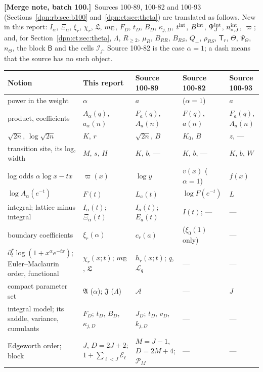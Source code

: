 \documentclass[11pt]{article}
\numberwithin{equation}{section}
\theoremstyle{definition}\newtheorem{definition}[theorem]{Definition}
\theoremstyle{remark}\newtheorem{remark}[theorem]{Remark}
\newcommand{\mergenoted}[1]{\par\smallskip\noindent\textbf{[Merge note, batch 100.]}\ #1\par\smallskip}
\begin{document}
\mergenoted{Sources 100-89, 100-82 and 100-93 (Sections~\ref{dpn:rb:sec:b100}
and~\ref{dpn:ct:sec:theta}) are translated as follows.  New in this report:
$I_\alpha$, $\Xi_\alpha$, $\xi_r$, $\chi_r$, $\mathfrak L$, $m_{\rm E}$, $F_D$,
$t_D$, $B_D$, $\kappa_{j,D}$, $t^{\rm int}$, $B^{\rm int}$, $\Psi^{\rm int}_J$,
$n^{\rm int}_{*,J}$, $\varpi$; and, for Section~\ref{dpn:ct:sec:theta}, $\Lambda$,
$R_{\ge2}$, $\mu_R$, $B_{RR}$, $B_{RS}$, $Q_\perp$, $\rho_{RS}$, $\mathsf T_r$,
$\Theta$, $\Psi_\Theta$, $n_\Theta$, the block $\mathsf B$ and the cells
$\mathcal I_j$.  Source 100-82 is the case $\alpha=1$; a dash means that the
source has no such object.}
\begin{center}
\footnotesize
\setlength{\tabcolsep}{3.5pt}
\begin{tabular}{>{\raggedright\arraybackslash}p{3.3cm}>{\raggedright\arraybackslash}p{3.0cm}>{\raggedright\arraybackslash}p{2.6cm}>{\raggedright\arraybackslash}p{2.6cm}>{\raggedright\arraybackslash}p{2.6cm}}
\toprule
Notion & This report & Source 100-89 & Source 100-82 & Source 100-93\\
\midrule
power in the weight & $\alpha$ & $a$ & ($\alpha=1$) & $a$\\
product, coefficients & $A_\alpha(q)$, $a_\alpha(n)$ & $F_a(q)$, $A_a(n)$ & $F(q)$, $a(n)$ & $F_a(q)$, $A_a(n)$\\
$\sqrt{2n}$, $\log\sqrt{2n}$ & $K$, $r$ & $\sqrt{2n}$, $B$ & $K_0$, $B$ & $z$, ---\\
transition site, its log, width & $M$, $s$, $H$ & $K$, $b$, --- & $K$, $b$, --- & $K$, $b$, $W$\\
log odds $\alpha\log x-tx$ & $\varpi(x)$ & $\log y$ & $v(x)$ ($\alpha=1$) & $f(x)$\\
$\log A_\alpha(e^{-t})$ & $F(t)$ & $L_a(t)$ & $\log F(e^{-t})$ & $L$\\
integral; lattice minus integral & $I_\alpha(t)$; $\Xi_\alpha(t)$ & $I_a(t)$; $E_a(t)$ & $I(t)$; --- & ---\\
boundary coefficients & $\xi_r(\alpha)$ & $c_r(a)$ & ($\xi_0(1)$ only) & ---\\
$\partial_t^r\log(1+x^\alpha e^{-tx})$; Euler--Maclaurin order, functional & $\chi_r(x;t)$; $m_{\rm E}$, $\mathfrak L$ & $h_r(x;t)$; $q$, $\mathcal L_q$ & --- & ---\\
compact parameter set & $\mathfrak A$ ($\alpha$); $\mathfrak J$ ($\Lambda$) & $\mathcal A$ & --- & $J$\\
integral model; its saddle, variance, cumulants & $F_D$; $t_D$, $B_D$, $\kappa_{j,D}$ & $J_D$; $t_D$, $v_D$, $k_{j,D}$ & --- & ---\\
Edgeworth order; block & $J$, $D=2J+2$; $1+\sum_{\ell<J}\mathcal E_\ell$ & $M=J-1$, $D=2M+4$; $\mathcal P_M$ & --- & ---\\
\bottomrule
\end{tabular}


\end{center}
\end{document}
